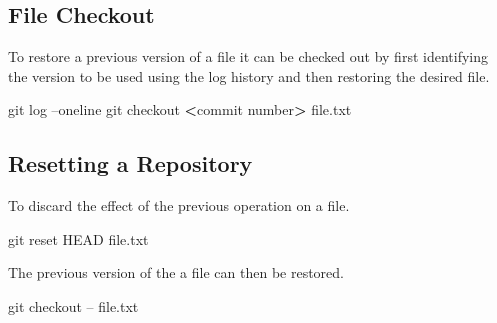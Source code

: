 \documentclass[]{book}
\newenvironment{Shaded}{\begin{snugshade}}{\end{snugshade}}
\newcommand{\FunctionTok}[1]{\textcolor[rgb]{0.00,0.00,0.00}{#1}}
\newcommand{\OperatorTok}[1]{\textcolor[rgb]{0.81,0.36,0.00}{\textbf{#1}}}
\newcommand{\NormalTok}[1]{#1}
\begin{document}
\subsection{File Checkout}\label{file-checkout}

To restore a previous version of a file it can be checked out by first
identifying the version to be used using the log history and then
restoring the desired file.

\begin{Shaded}
\begin{Highlighting}[]
\FunctionTok{git}\NormalTok{ log --oneline}
\FunctionTok{git}\NormalTok{ checkout }\OperatorTok{<}\NormalTok{commit number}\OperatorTok{>}\NormalTok{ file.txt}
\end{Highlighting}
\end{Shaded}

\subsection{Resetting a Repository}\label{resetting-a-repository}

To discard the effect of the previous operation on a file.

\begin{Shaded}
\begin{Highlighting}[]
\FunctionTok{git}\NormalTok{ reset HEAD file.txt}
\end{Highlighting}
\end{Shaded}

The previous version of the a file can then be restored.

\begin{Shaded}
\begin{Highlighting}[]
\FunctionTok{git}\NormalTok{ checkout -- file.txt}
\end{Highlighting}
\end{Shaded}


\end{document}
